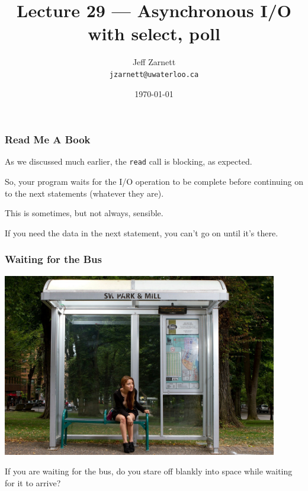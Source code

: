 

\title{Lecture 29 --- Asynchronous I/O with select, poll }

\author{Jeff Zarnett \\ \small \texttt{jzarnett@uwaterloo.ca}}
\date{\today}




\begin{frame}
	\titlepage

\end{frame}


\begin{frame}
	\frametitle{Read Me A Book}

	As we discussed much earlier, the \texttt{read} call is blocking, as expected.

	So, your program waits for the I/O operation to be complete before continuing on to the next statements (whatever they are).

	This is sometimes, but not always, sensible.

	If you need the data in the next statement, you can't go on until it's there.

\end{frame}


\begin{frame}
	\frametitle{Waiting for the Bus}

	\begin{center}
		\includegraphics[width=0.9\textwidth]{images/thebus.jpg}
	\end{center}

	If you are waiting for the bus, do you stare off blankly into space while waiting for it to arrive?

\end{frame}

